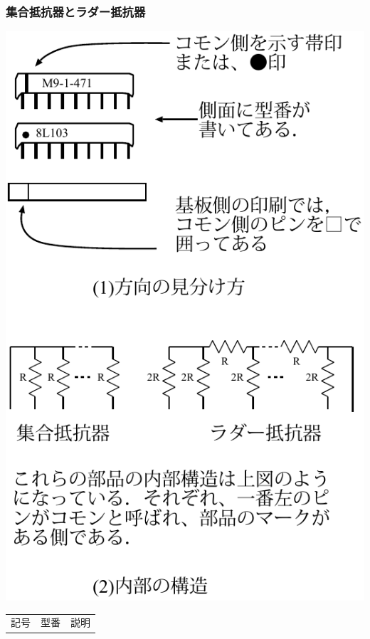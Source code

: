 \documentclass{beamer}                 %
\begin{document}
\begin{frame}
  \frametitle{集合抵抗器とラダー抵抗器}
  \begin{minipage}{0.45\columnwidth}
    \includegraphics[scale=0.56]{../chap3/syuugou.pdf}
  \end{minipage}
  \begin{minipage}{0.54\columnwidth}
    \begin{center}
      {\footnotesize\begin{tabular}{l|l|l}
        \hline
        \hline
        \multicolumn{1}{c|}{記号} &
        \multicolumn{1}{c|}{型番} &
        \multicolumn{1}{c}{説明} \\

\end{tabular}}
\end{center}
\end{minipage}
\end{frame}
\end{document}
